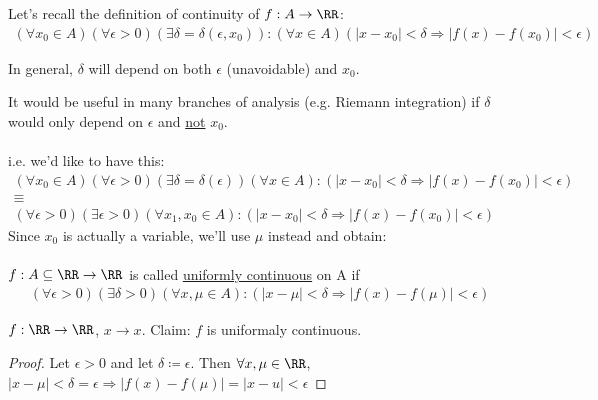 \documentclass[class=scrartcl, crop=false]{standalone}
\begin{document}
\begin{definition}
  Let's recall the definition of continuity of $f: A \to \RR$:
  \begin{gather*}
    (\forall x_0 \in A) (\forall \epsilon > 0)(\exists \delta = \delta(\epsilon, x_0)) : (\forall x \in A) (|x - x_0| < \delta \Rightarrow |f(x) - f(x_0)| < \epsilon)
  \end{gather*} 
  \begin{note}
    In general, $\delta$ will depend on both $\epsilon$ (unavoidable) and $x_0$.
  \end{note} 
  It would be useful in many branches of analysis (e.g. Riemann integration) if $\delta$ would only depend on $\epsilon$ and \ul{not} $x_0$.
  \\\\
  i.e. we'd like to have this:
  \begin{gather*}
    (\forall x_0 \in A)(\forall \epsilon > 0)(\exists \delta = \delta (\epsilon)) (\forall x \in A) : (|x - x_0| < \delta \Rightarrow |f(x) - f(x_0)| < \epsilon)
    \\
    \equiv
    \\
    (\forall \epsilon > 0)(\exists \epsilon > 0)(\forall x_1, x_0 \in A) : (|x - x_0| < \delta \Rightarrow |f(x) - f(x_0)| < \epsilon)
  \end{gather*} 
  Since $x_0$ is actually a variable, we'll use $\mu$ instead and obtain:
  \\\\
  $f : A \subseteq \RR \to \RR$ is called \ul{uniformly continuous} on A if 
  \begin{gather*}
    (\forall \epsilon > 0)(\exists \delta > 0) (\forall x, \mu \in A) : (|x - \mu| < \delta \Rightarrow |f(x) - f(\mu)| < \epsilon)
  \end{gather*} 
\end{definition} 

\begin{example}
  $f : \RR \to \RR$, $x \to x$. Claim: $f$ is uniformaly continuous.
  \begin{proof}
    Let $\epsilon > 0$ and let $\delta \coloneqq \epsilon$. Then $\forall x, \mu \in \RR$, $|x - \mu| < \delta = \epsilon \Rightarrow |f(x) - f(\mu)| = |x - u| < \epsilon$
  \end{proof} 
\end{example} 
\end{document}

